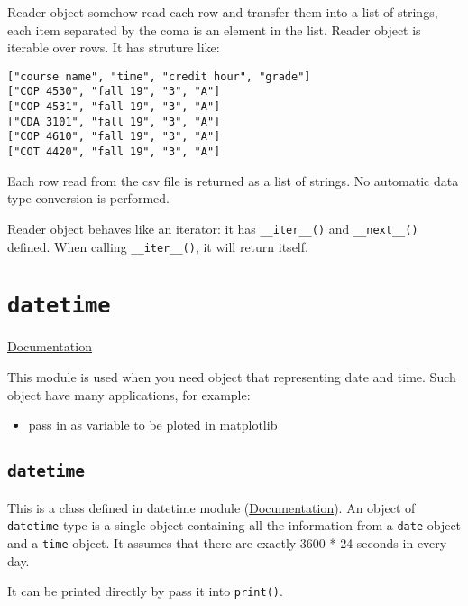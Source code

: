 \documentclass[12pt]{book}
\begin{document}
Reader object somehow read each row and transfer them into a list of strings, each item separated by the coma is an element in the list. Reader object is iterable over rows. It has struture like:
\begin{verbatim}
["course name", "time", "credit hour", "grade"]
["COP 4530", "fall 19", "3", "A"]
["COP 4531", "fall 19", "3", "A"]
["CDA 3101", "fall 19", "3", "A"]
["COP 4610", "fall 19", "3", "A"]
["COT 4420", "fall 19", "3", "A"]
\end{verbatim}
Each row read from the csv file is returned as a list of strings. No automatic data type conversion is performed.

Reader object behaves like an iterator: it has \texttt{\_\_iter\_\_()} and \texttt{\_\_next\_\_()} defined. When calling \texttt{\_\_iter\_\_()}, it will return itself. 
\chapter{\texttt{datetime}}
\label{sec:org00b3cad}
\href{https://docs.python.org/3/library/datetime.html}{Documentation}

This module is used when you need object that representing date and time. Such object have many applications, for example:
\begin{itemize}
\item pass in as variable to be ploted in matplotlib
\end{itemize}

\section{\texttt{datetime}}
\label{sec:orgc1740b3}
This is a class defined in datetime module (\href{https://docs.python.org/3/library/datetime.html\#datetime.datetime}{Documentation}). An object of \texttt{datetime} type is a single object containing all the information from a \texttt{date} object and a \texttt{time} object. It assumes that there are exactly 3600 * 24 seconds in every day.

It can be printed directly by pass it into \texttt{print()}.
\end{document}
